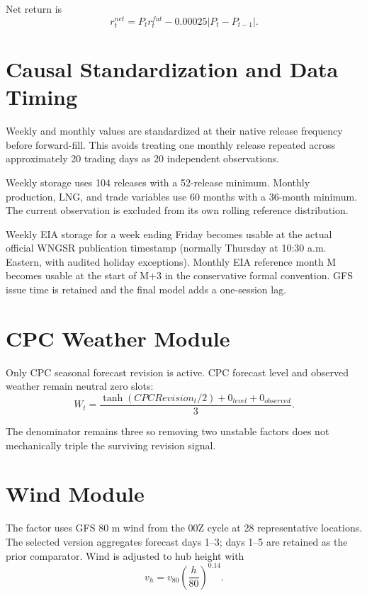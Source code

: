 \documentclass[11pt,a4paper]{article}
\begin{document}
Net return is
\begin{equation}
r^{net}_t=P_t r^{fut}_t-0.00025\left|P_t-P_{t-1}\right|.
\end{equation}

\section{Causal Standardization and Data Timing}

Weekly and monthly values are standardized at their native release frequency
before forward-fill. This avoids treating one monthly release repeated across
approximately 20 trading days as 20 independent observations.

Weekly storage uses 104 releases with a 52-release minimum. Monthly production,
LNG, and trade variables use 60 months with a 36-month minimum. The current
observation is excluded from its own rolling reference distribution.

Weekly EIA storage for a week ending Friday becomes usable at
the actual official WNGSR publication timestamp (normally Thursday at 10:30
a.m. Eastern, with audited holiday exceptions). Monthly EIA reference month M
becomes usable at the start of M+3 in
the conservative formal convention. GFS issue time is retained and the final
model adds a one-session lag.

\section{CPC Weather Module}

Only CPC seasonal forecast revision is active. CPC forecast level and observed
weather remain neutral zero slots:
\begin{equation}
W_t=\frac{\tanh(CPCRevision_t/2)+0_{level}+0_{observed}}{3}.
\end{equation}

The denominator remains three so removing two unstable factors does not
mechanically triple the surviving revision signal.

\section{Wind Module}

The factor uses GFS 80 m wind from the 00Z cycle at 28 representative
locations. The selected version aggregates forecast days 1--3; days 1--5 are
retained as the prior comparator. Wind is adjusted to hub height with
\begin{equation}
v_h=v_{80}\left(\frac{h}{80}\right)^{0.14}.
\end{equation}
\end{document}
